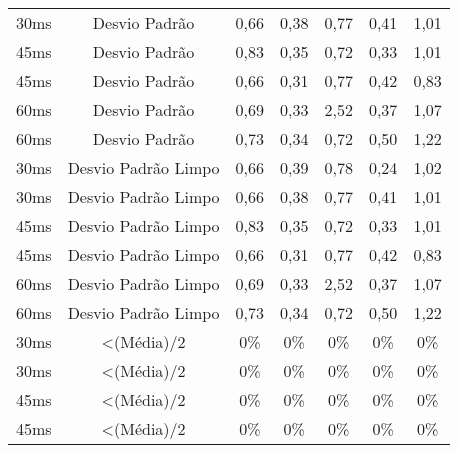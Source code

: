 \begin{table}[]
\begin{tabular}{|c|c|ccccc|}
30ms              & Desvio Padrão       & 0,66              & 0,38              & 0,77              & 0,41              & 1,01              \\
45ms              & Desvio Padrão       & 0,83              & 0,35              & 0,72              & 0,33              & 1,01              \\
45ms              & Desvio Padrão       & 0,66              & 0,31              & 0,77              & 0,42              & 0,83              \\
60ms              & Desvio Padrão       & 0,69              & 0,33              & 2,52              & 0,37              & 1,07              \\
60ms              & Desvio Padrão       & 0,73              & 0,34              & 0,72              & 0,50              & 1,22              \\ \hline
30ms              & Desvio Padrão Limpo & 0,66              & 0,39              & 0,78              & 0,24              & 1,02              \\
30ms              & Desvio Padrão Limpo & 0,66              & 0,38              & 0,77              & 0,41              & 1,01              \\
45ms              & Desvio Padrão Limpo & 0,83              & 0,35              & 0,72              & 0,33              & 1,01              \\
45ms              & Desvio Padrão Limpo & 0,66              & 0,31              & 0,77              & 0,42              & 0,83              \\
60ms              & Desvio Padrão Limpo & 0,69              & 0,33              & 2,52              & 0,37              & 1,07              \\
60ms              & Desvio Padrão Limpo & 0,73              & 0,34              & 0,72              & 0,50              & 1,22              \\ \hline
30ms              & \textless (Média)/2 & 0\%            & 0\%            & 0\%            & 0\%            & 0\%            \\
30ms              & \textless (Média)/2 & 0\%            & 0\%            & 0\%            & 0\%            & 0\%            \\
45ms              & \textless (Média)/2 & 0\%            & 0\%            & 0\%            & 0\%            & 0\%            \\
45ms              & \textless (Média)/2 & 0\%            & 0\%            & 0\%            & 0\%            & 0\%            \\

\end{tabular}
\end{table}
